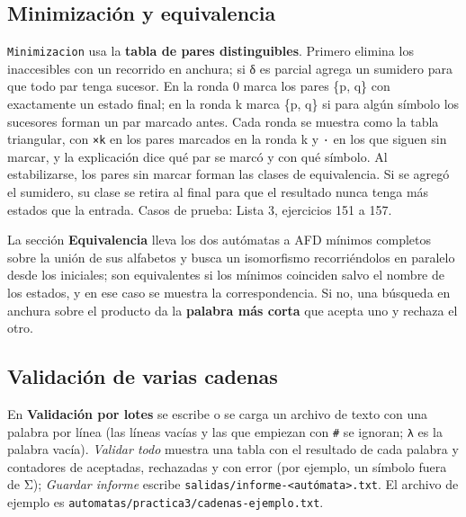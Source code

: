 
\hypertarget{minimizaciuxf3n-y-equivalencia}{%
\subsection{Minimización y equivalencia}\label{minimizaciuxf3n-y-equivalencia}}

\texttt{Minimizacion} usa la \textbf{tabla de pares distinguibles}. Primero elimina los inaccesibles con un recorrido en anchura; si δ es parcial agrega un sumidero para que todo par tenga sucesor. En la ronda 0 marca los pares \{p, q\} con exactamente un estado final; en la ronda k marca \{p, q\} si para algún símbolo los sucesores forman un par marcado antes. Cada ronda se muestra como la tabla triangular, con \texttt{×k} en los pares marcados en la ronda k y \texttt{·} en los que siguen sin marcar, y la explicación dice qué par se marcó y con qué símbolo. Al estabilizarse, los pares sin marcar forman las clases de equivalencia. Si se agregó el sumidero, su clase se retira al final para que el resultado nunca tenga más estados que la entrada. Casos de prueba: Lista 3, ejercicios 151 a 157.

La sección \textbf{Equivalencia} lleva los dos autómatas a AFD mínimos completos sobre la unión de sus alfabetos y busca un isomorfismo recorriéndolos en paralelo desde los iniciales; son equivalentes si los mínimos coinciden salvo el nombre de los estados, y en ese caso se muestra la correspondencia. Si no, una búsqueda en anchura sobre el producto da la \textbf{palabra más corta} que acepta uno y rechaza el otro.



\hypertarget{validaciuxf3n-de-varias-cadenas}{%
\subsection{Validación de varias cadenas}\label{validaciuxf3n-de-varias-cadenas}}

En \textbf{Validación por lotes} se escribe o se carga un archivo de texto con una palabra por línea (las líneas vacías y las que empiezan con \texttt{\#} se ignoran; \texttt{λ} es la palabra vacía). \emph{Validar todo} muestra una tabla con el resultado de cada palabra y contadores de aceptadas, rechazadas y con error (por ejemplo, un símbolo fuera de Σ); \emph{Guardar informe} escribe \texttt{salidas/informe-\textless{}autómata\textgreater{}.txt}. El archivo de ejemplo es \texttt{automatas/practica3/cadenas-ejemplo.txt}.

